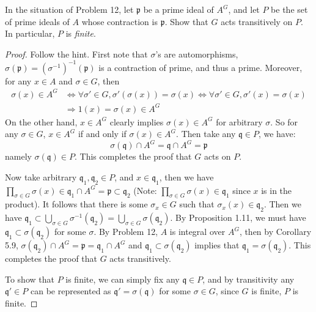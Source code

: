 \documentclass{solution}
\begin{document}
\begin{problem}
    In the situation of Problem 12, let $\mathfrak{p}$ be a prime ideal of $A^G$, and let $P$ be the set of prime ideals of $A$ whose contraction is $\mathfrak{p}$. Show that $G$ acts transitively on $P$. In particular, $P$ is \textit{finite}.
\end{problem}

\begin{proof}
    Follow the hint. First note that $\sigma$'s are automorphisms, $\sigma(\mathfrak{p}) = (\sigma ^{-1})^{-1}(\mathfrak{p})$ is a contraction of prime, and thus a prime. Moreover, for any $x \in A$ and $\sigma \in G$, then
    $$
        \begin{aligned}
        \sigma(x) \in A^G &\Leftrightarrow \forall \sigma' \in G, \sigma'(\sigma(x)) = \sigma(x) \Leftrightarrow \forall \sigma' \in G, \sigma'(x) = \sigma(x) \\
        &\Rightarrow 1(x) = \sigma(x) \in A^G
        \end{aligned}
    $$
    On the other hand, $x \in A^G$ clearly implies $\sigma(x) \in A^G$ for arbitrary $\sigma$. So for any $\sigma \in G$, $x \in A^G$ if and only if $\sigma(x) \in A^G$. Then take any $\mathfrak{q} \in P$, we have:
    $$\sigma(\mathfrak{q}) \cap A^G = \mathfrak{q} \cap A^G = \mathfrak{p}$$
    namely $\sigma(\mathfrak{q}) \in P$. This completes the proof that $G$ acts on $P$.
    
    Now take arbitrary $\mathfrak{q}_1, \mathfrak{q}_2 \in P$, and $x \in \mathfrak{q}_1$, then we have $\prod\limits_{\sigma \in G} \sigma(x) \in \mathfrak{q}_1 \cap A^G = \mathfrak{p} \subset \mathfrak{q}_2$ (Note: $\prod\limits_{\sigma \in G} \sigma(x) \in \mathfrak{q}_1$ since $x$ is in the product). It follows that there is some $\sigma_x \in G$ such that $\sigma_x(x) \in \mathfrak{q}_2$. Then we have $\mathfrak{q}_1 \subset \bigcup\limits_{\sigma \in G} \sigma ^{-1}(\mathfrak{q}_2) = \bigcup\limits_{\sigma \in G} \sigma(\mathfrak{q}_2)$. By Proposition 1.11, we must have $\mathfrak{q}_1 \subset \sigma(\mathfrak{q}_2)$ for some $\sigma$. By Problem 12, $A$ is integral over $A^G$, then by Corollary 5.9, $\sigma(\mathfrak{q}_2) \cap A^G = \mathfrak{p} = \mathfrak{q}_1 \cap A^G$ and $\mathfrak{q}_1 \subset \sigma(\mathfrak{q}_2)$ implies that $\mathfrak{q}_1 = \sigma(\mathfrak{q}_2)$. This completes the proof that $G$ acts transitively.

    To show that $P$ is finite, we can simply fix any $\mathfrak{q} \in P$, and by transitivity any $\mathfrak{q}' \in P$ can be represented as $\mathfrak{q}' = \sigma(\mathfrak{q})$ for some $\sigma \in G$, since $G$ is finite, $P$ is finite.
\end{proof}
\end{document}

